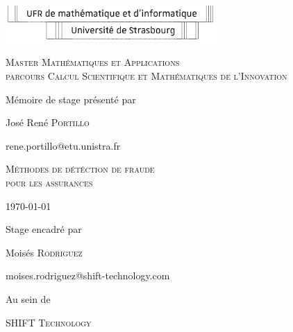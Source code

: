 \documentclass [twoside,openright,a4paper,11pt,french] {report}
\begin{document}

\thispagestyle{empty}

\begin{center}
    \includegraphics [width=8.1cm] {logo-ufr.pdf}       

    \vfill\vfill

    {
	\large
	\textsc {
	    Master Mathématiques et Applications\\
	    parcours Calcul Scientifique et Mathématiques de l'Innovation
	}
    }

    \bigskip\bigskip

    {\large Mémoire de stage présenté par}

    \medskip

    {\large José René \textsc {Portillo}}

    {\small rene.portillo@etu.unistra.fr}

    \vfill

    {
	\huge
	\textsc {
	    Méthodes de détéction de fraude  \\
	    pour les assurances \\	    
	}
    }

    \vfill

    \today

    \vfill

    {\large Stage encadré par}

    \medskip

    {\large Moisés \textsc {Rodriguez}}

    {\small moises.rodriguez@shift-technology.com}

    \bigskip

    {\large Au sein de}

    \medskip

    {
	\large
	\textsc {SHIFT Technology}
    }

    \bigskip
    \bigskip


\end{center}
\end{document}
